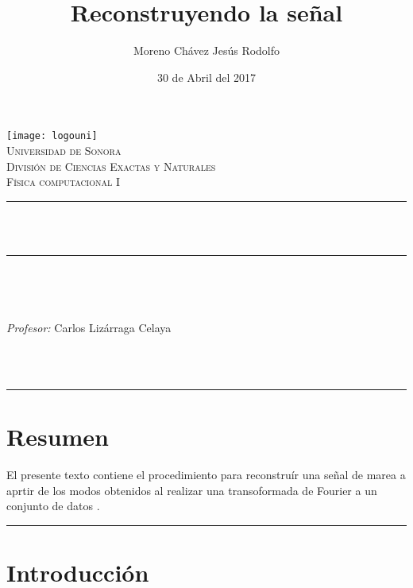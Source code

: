 \documentclass[12pt]{article}
\title{Reconstruyendo la señal}		%
\author{\centering Moreno Chávez Jesús Rodolfo}											%
\date{30 de Abril del 2017} %
\makeatletter
\let\thetitle\@title
\let\theauthor\@author
\let\thedate\@date
\makeatother
\begin{document}

\begin{titlepage}
	\centering
    \vspace*{0.5 cm}
    \texttt{[image: logouni]}\\[0.5 cm]	%
    \textsc{\Large Universidad de Sonora}\\[1.0 cm]	%
	\textsc{\Large División de Ciencias Exactas y Naturales}\\[0.5 cm]				%
	\textsc{\large Física computacional I}\\[0.5 cm]				%
	\rule{\linewidth}{0.2 mm} \\[0.4 cm]
	{ \huge \bfseries \thetitle}\\
	\rule{\linewidth}{0.2 mm} \\[0.5 cm]
	
	\begin{minipage}{\textwidth}
		\begin{flushleft} 
			\emph{\Large} \large \\
			\theauthor
			\end{flushleft}
	
		\begin{flushleft} 
			\emph{\Large Profesor:} \large \centering Carlos Lizárraga Celaya 	
			\end{flushleft}
	\end{minipage}\\[1 cm]
	{\large \thedate}\\[2 cm]
 
	\vfill
	
\end{titlepage}
\newpage 
\hrule 
\section*{Resumen}
El presente texto contiene el procedimiento para reconstruír una señal de marea a aprtir de los modos obtenidos al realizar una transoformada de Fourier a un conjunto de datos . 
\vspace{0.5 cm}
\hrule
\vspace{0.9 cm}


\section*{Introducción}
\end{document}
